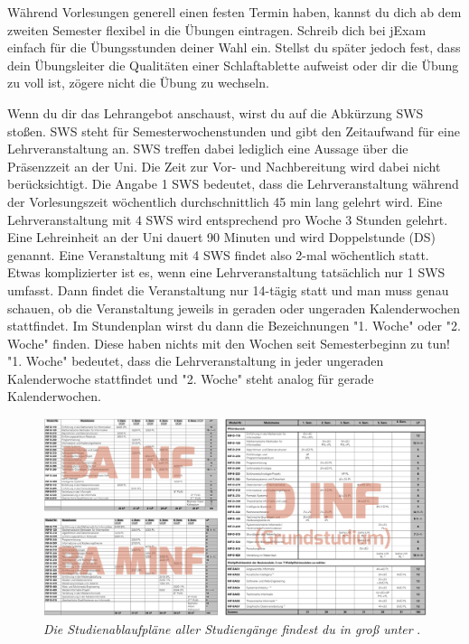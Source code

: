 \pagebreak

Während Vorlesungen generell einen festen Termin haben, kannst du dich ab dem zweiten Semester flexibel in die Übungen eintragen.
Schreib dich bei jExam  einfach für die Übungsstunden deiner Wahl ein.
Stellst du später jedoch fest, dass dein Übungsleiter die Qualitäten einer Schlaftablette aufweist oder dir die Übung zu voll ist, zögere nicht die Übung zu wechseln.

Wenn du dir das Lehrangebot anschaust, wirst du auf die Abkürzung SWS stoßen. SWS steht für Semesterwochenstunden und gibt den Zeitaufwand für eine Lehrveranstaltung an.
SWS treffen dabei lediglich eine Aussage über die Präsenzzeit an der Uni. Die Zeit zur Vor- und Nachbereitung wird dabei nicht berücksichtigt.
Die Angabe 1 SWS bedeutet, dass die Lehrveranstaltung während der Vorlesungszeit wöchentlich durchschnittlich 45 min lang gelehrt wird. Eine Lehrveranstaltung mit 4 SWS wird entsprechend
pro Woche 3 Stunden gelehrt. Eine Lehreinheit an der Uni dauert 90 Minuten und wird Doppelstunde (DS) genannt. Eine Veranstaltung mit 4 SWS findet also 2-mal wöchentlich statt.
Etwas komplizierter ist es, wenn eine Lehrveranstaltung tatsächlich nur 1 SWS umfasst. Dann findet die Veranstaltung nur 14-tägig statt und man muss genau schauen, ob die Veranstaltung jeweils in
geraden oder ungeraden Kalenderwochen stattfindet. Im Stundenplan wirst du dann die Bezeichnungen "1. Woche" oder "2. Woche" finden. Diese haben nichts mit den Wochen seit Semesterbeginn zu tun!
"1. Woche" bedeutet, dass die Lehrveranstaltung in jeder ungeraden Kalenderwoche stattfindet und "2. Woche" steht analog für gerade Kalenderwochen.

\begin{figure}
	\includegraphics[width=\textwidth]{img/alle_studienablaufplaene.png}
	\caption*{\small \textit{Die Studienablaufpläne aller Studiengänge findest du in groß unter} .}
\end{figure}

